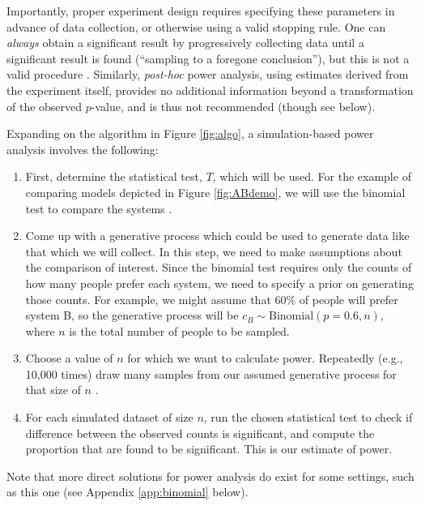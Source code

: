 \documentclass[11pt,a4paper]{article}
\begin{document}
Importantly, proper experiment design requires specifying these parameters in advance of data collection, or otherwise using a valid stopping rule.  One can \emph{always} obtain a significant result by progressively collecting data until a significant result is found (``sampling to a foregone conclusion''), but this is not a valid procedure
\citep{anscombe.1954,wagenmakers.2007}. Similarly, \emph{post-hoc} power analysis, using estimates derived from the experiment itself, provides no additional information beyond a transformation of the observed $p$-value, and is thus not recommended (though see below).

Expanding on the algorithm in Figure \ref{fig:algo}, a simulation-based power analysis involves the following:
\begin{enumerate}
\item First, determine the statistical test, $T$, which will be used. For the example of comparing models depicted in Figure \ref{fig:ABdemo}, we will use the binomial test to compare the systems \citep{dror.2018}.
\item Come up with a generative process which could be used to generate data like that which we will collect. In this step, we need to make assumptions about the comparison of interest. Since the binomial test requires only the counts of how many people prefer each system, we need to specify a prior on generating those counts. For example, we might assume that 60\% of people will prefer system B, so the generative process will be $c_B \sim \textrm{Binomial}(p=0.6, n)$, where $n$ is the total number of people to be sampled.
\item Choose a value of $n$ for which we want to calculate power. Repeatedly (e.g., 10,000 times) draw many samples from our assumed generative process for that size of $n$ . 
\item For each simulated dataset of size $n$, run the chosen statistical test to check if difference between the observed counts is significant, and compute the proportion that are found to be significant. This is our estimate of power.
\end{enumerate}

Note that more direct solutions for power analysis do exist for some settings, such as this one (see Appendix \ref{app:binomial} below). 
\end{document}

